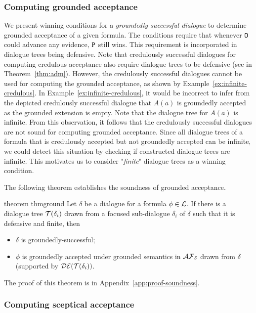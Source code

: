 \subsubsection{Computing grounded acceptance}
We present winning conditions for a \textit{groundedly successful dialogue} to determine grounded acceptance of a given formula. %
The conditions require that whenever $\texttt{\textup{O}}$ could advance any evidence, $\texttt{\textup{P}}$ still wins.
This requirement is incorporated in dialogue trees being defensive.
Note that credulously successful dialogues for computing credulous acceptance also require dialogue trees to be defensive (see in Theorem~\ref{thm:adm}).
However, the credulously successful dialogues cannot be used for computing the grounded acceptance, as shown by Example~\ref{ex:infinite-credulous}.
In Example~\ref{ex:infinite-credulous}, it would be incorrect to infer from the depicted credulously successful dialogue that $A(a)$ is groundedly accepted as the grounded extension is empty. Note that the dialogue tree for $A(a)$ is infinite.
From this observation, it follows that the credulously successful dialogues are not sound for computing grounded acceptance. Since all dialogue trees of a formula that is credulously accepted but not groundedly accepted can be infinite,
we could detect this situation by checking if constructed dialogue trees are infinite. This motivates us to consider "\textit{finite}" dialogue trees as a winning condition.

The following theorem establishes the soundness of grounded acceptance.
\begin{restatable} {theorem} {thmground}   
\label{thm:ground}
Let $\delta$ be a dialogue for a formula $\phi \in \mathcal{L}$. If there is a dialogue tree $\mathcal{T}(\delta_i)$ drawn from a focused sub-dialogue $\delta_i$ of $\delta$ such that it is defensive and finite, then
  \begin{itemize}
    \item $\delta$ is groundedly-successful;
      \item $\phi$ is groundedly accepted under grounded semantics in $\mathcal{AF}_ \delta$ drawn from $\delta$ (supported by $\mathcal{DE}(\mathcal{T}(\delta_i))$.
\end{itemize}
\end{restatable}

The proof of this theorem is in Appendix~\ref{app:proof-soundness}.

\subsubsection{Computing sceptical acceptance}


